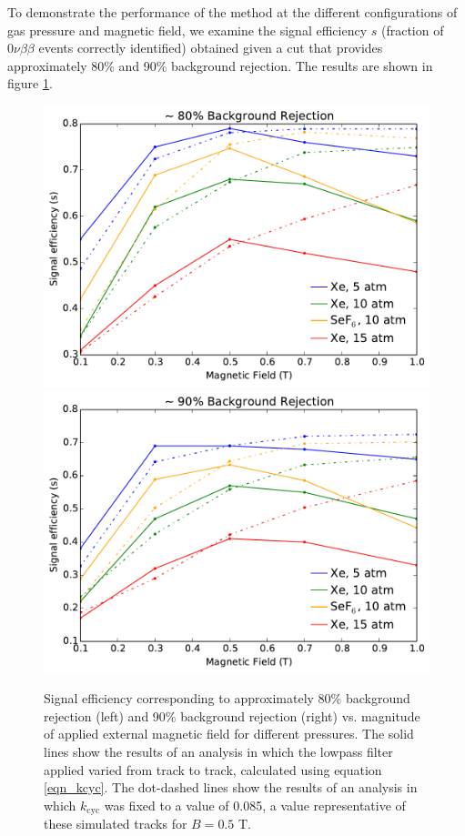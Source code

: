 \documentclass{JINST}
\begin{document}
To demonstrate the performance of the method at the different configurations of gas pressure and magnetic 
field, we examine the signal efficiency $s$ (fraction of $0\nu\beta\beta$ events correctly identified) obtained 
given a cut that provides approximately 80\% and 90\% background rejection.  The results are shown in figure 
\ref{fig_config}.

\begin{figure}[!htb]
	\centering
	\includegraphics[scale=0.43]{fig/eff_vs_b_80.pdf}
	\includegraphics[scale=0.43]{fig/eff_vs_b_90.pdf}
	\caption{\label{fig_config}Signal efficiency corresponding to approximately 80\% background rejection (left) and 90\% background rejection (right) vs. magnitude of applied external magnetic field for different pressures.  The solid lines show the results of an analysis in which the lowpass filter applied varied from track to track, calculated using equation \protect\ref{eqn_kcyc}.  The dot-dashed lines show the results of an analysis in which $k_{\mathrm{cyc}}$ was fixed to a value of 0.085, a value representative of these simulated tracks for $B = 0.5$ T.}  %
\end{figure}
\end{document}
